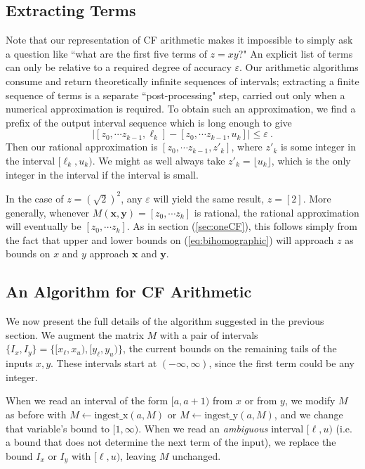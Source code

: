\documentclass[11pt, oneside]{amsart}   	%
\renewcommand{\:}{\negthickspace:\negthickspace}
\begin{document}
\subsection{Extracting Terms}
Note that our representation of CF arithmetic makes it impossible to simply ask a question like ``what are the first
five terms of $z = xy$?" An explicit list of terms can only be relative to a required degree of accuracy $\varepsilon$. Our arithmetic
algorithms consume and return theoretically infinite sequences of intervals; extracting a finite sequence of terms is a separate
``post-processing" step, carried out only when a numerical approximation is required.
To obtain such an approximation, we find a prefix of
the output interval sequence which is long enough to give
\[
 \bigl| [z_0, \cdots z_{k-1}, \ell_k] - [z_0, \cdots z_{k-1}, u_k] \bigr| \leq \varepsilon \ .
\]
Then our rational approximation is $[z_0, \cdots z_{k-1}, z'_k]$, where $z'_k$ is some integer in the interval
$[\ell_k,u_k)$. We might as well always take $z'_k = \lfloor u_k \rfloor$, which is the only integer in the interval if the interval is small. 

In the case of $z=(\sqrt{2})^2$, any $\varepsilon$ will yield the same result, $z = [2]$. More generally, whenever $M(\mathbf{x},\mathbf{y}) = [z_0, \cdots z_k]$ is rational, the rational approximation will eventually be $[z_0, \cdots z_k]$. As in section (\ref{sec:oneCF}), this follows simply from the fact that upper and lower bounds on (\ref{eq:bihomographic}) will approach $z$ as bounds on $x$ and $y$ approach $\mathbf{x}$ and $\mathbf{y}$.

\subsection{An Algorithm for CF Arithmetic}\label{sec:finalAlgorithm}
We now present the full details of the algorithm suggested in the previous section.  We augment the matrix $M$ with a pair of intervals
$\{I_x, I_y\} = \{[x_{\ell},x_{u}), [y_{\ell}, y_{u})\}$, the current bounds on the remaining tails of the inputs $x,y$. These
intervals start at $(-\infty, \infty)$, since the first term could be any integer.

When we read an interval of the form $[a,a+1)$ from
$x$ or from $y$, we modify $M$ as before with $M \leftarrow \mbox{ingest\_x}(a,M)$ or $M \leftarrow \mbox{ingest\_y}(a,M)$,
and we change that variable's bound to $[1, \infty)$. When we read an \emph{ambiguous} interval $[\ell, u)$ (i.e. a bound that
does not determine the next term of the input), we replace the bound $I_x$ or $I_y$  with $[\ell, u)$, leaving $M$ unchanged.
\end{document}
